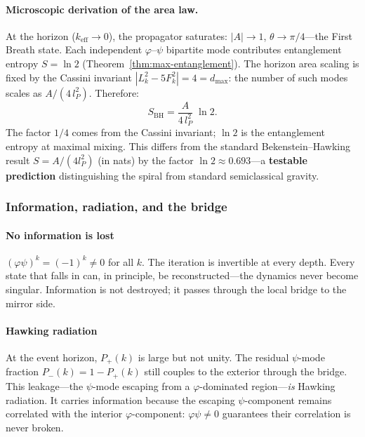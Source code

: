 \documentclass[12pt,a4paper]{article}
\begin{document}
\paragraph{Microscopic derivation of the area law.}
At the horizon ($k_{\mathrm{eff}} \to 0$), the propagator saturates: $|A| \to 1$, $\theta \to \pi/4$---the First Breath state. Each independent $\varphi$--$\psi$ bipartite mode contributes entanglement entropy $S = \ln 2$ (Theorem~\ref{thm:max-entanglement}). The horizon area scaling is fixed by the Cassini invariant $|L_k^2 - 5F_k^2| = 4 = d_{\max}$: the number of such modes scales as $A/(4\,l_P^2)$. Therefore:
\begin{equation}
\boxed{S_{\mathrm{BH}} = \frac{A}{4\,l_P^2}\;\ln 2.}
\end{equation}
The factor $1/4$ comes from the Cassini invariant; $\ln 2$ is the entanglement entropy at maximal mixing. This differs from the standard Bekenstein--Hawking result $S = A/(4l_P^2)$ (in nats) by the factor $\ln 2 \approx 0.693$---a \textbf{testable prediction} distinguishing the spiral from standard semiclassical gravity.

\subsubsection{Information, radiation, and the bridge}
\label{sec:bh-bridge}

\paragraph{No information is lost}

$(\varphi\psi)^k = (-1)^k \neq 0$ for all $k$. The iteration is invertible at every depth. Every state that falls in can, in principle, be reconstructed---the dynamics never become singular. Information is not destroyed; it passes through the local bridge to the mirror side.
\paragraph{Hawking radiation}

At the event horizon, $P_+(k)$ is large but not unity. The residual $\psi$-mode fraction $P_-(k) = 1 - P_+(k)$ still couples to the exterior through the bridge. This leakage---the $\psi$-mode escaping from a $\varphi$-dominated region---\emph{is} Hawking radiation. It carries information because the escaping $\psi$-component remains correlated with the interior $\varphi$-component: $\varphi\psi \neq 0$ guarantees their correlation is never broken.
\end{document}
